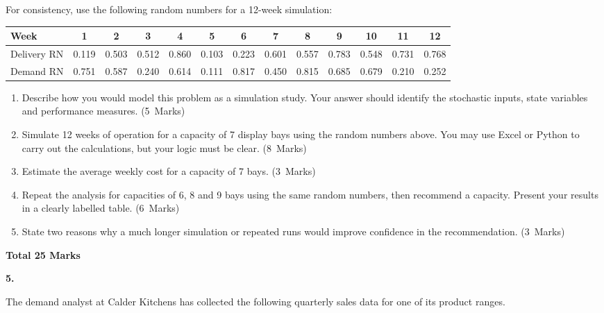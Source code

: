 \documentclass[11pt,a4paper]{article}
\newcommand{\markalloc}[1]{\nobreak\hfill\mbox{(#1 Marks)}}
\newcommand{\questiontotal}[1]{\begin{flushright}\textbf{Total #1 Marks}\end{flushright}}
\begin{document}
For consistency, use the following random numbers for a 12-week simulation:

\begin{center}
\scriptsize
\begin{tabular}{lcccccccccccc}
\toprule
Week & 1 & 2 & 3 & 4 & 5 & 6 & 7 & 8 & 9 & 10 & 11 & 12 \\
\midrule
Delivery RN & 0.119 & 0.503 & 0.512 & 0.860 & 0.103 & 0.223 & 0.601 & 0.557 & 0.783 & 0.548 & 0.731 & 0.768 \\
Demand RN & 0.751 & 0.587 & 0.240 & 0.614 & 0.111 & 0.817 & 0.450 & 0.815 & 0.685 & 0.679 & 0.210 & 0.252 \\
\bottomrule
\end{tabular}
\normalsize
\end{center}

\begin{enumerate}
\item Describe how you would model this problem as a simulation study. Your answer should identify the stochastic inputs, state variables and performance measures. \markalloc{5}

\item Simulate 12 weeks of operation for a capacity of 7 display bays using the random numbers above. You may use Excel or Python to carry out the calculations, but your logic must be clear. \markalloc{8}

\item Estimate the average weekly cost for a capacity of 7 bays. \markalloc{3}

\item Repeat the analysis for capacities of 6, 8 and 9 bays using the same random numbers, then recommend a capacity. Present your results in a clearly labelled table. \markalloc{6}

\item State two reasons why a much longer simulation or repeated runs would improve confidence in the recommendation. \markalloc{3}
\end{enumerate}

\questiontotal{25}

\newpage

\textbf{5.}

The demand analyst at Calder Kitchens has collected the following quarterly sales data for one of its product ranges.
\end{document}

